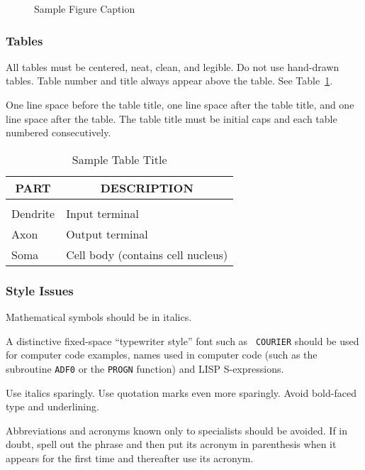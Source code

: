 \begin{figure}[h]
\vspace{1in}
\caption{Sample Figure Caption}
\end{figure}

\subsubsection{Tables}

All tables must be centered, neat, clean, and legible. Do not use
hand-drawn tables. Table number and title always appear above the
table.   See Table~\ref{sample-table}.

One line space before the table title, one line space after the table
title, and one line space after the table. The table title must be
initial caps and each table numbered consecutively.

\begin{table}[h]
\caption{Sample Table Title}
\label{sample-table}
\begin{center}
\begin{tabular}{ll}
\multicolumn{1}{c}{\bf PART}  &\multicolumn{1}{c}{\bf DESCRIPTION} \\
\hline \\
Dendrite         &Input terminal \\
Axon             &Output terminal \\
Soma             &Cell body (contains cell nucleus) \\
\end{tabular}
\end{center}
\end{table}

\subsubsection{Style Issues}

Mathematical symbols should be in italics.

A distinctive fixed-space ``typewriter style'' font such as {\tt
COURIER} should be used for computer code examples, names used in
computer code (such as the subroutine {\tt ADF0} or the {\tt PROGN}
function) and LISP S-expressions.

Use italics sparingly. Use quotation marks even more sparingly. Avoid
bold-faced type and underlining.

Abbreviations and acronyms known only to specialists should be avoided.
If in doubt, spell out the phrase and then put its acronym in parenthesis
when it appears for the first time and thereafter use its acronym.

